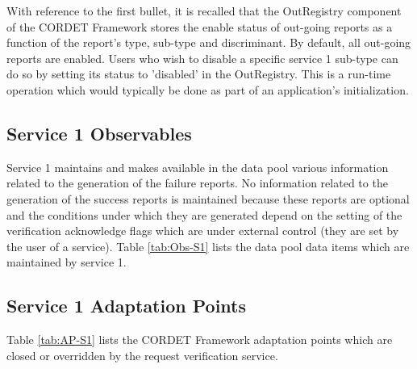 \documentclass{pnp_article}
\begin{document}
With reference to the first bullet, it is recalled that the OutRegistry component of the CORDET Framework stores the enable status of out-going reports as a function of the report's type, sub-type and discriminant. By default, all out-going reports are enabled. Users who wish to disable a specific service 1 sub-type can do so by setting its status to 'disabled' in the OutRegistry. This is a run-time operation which would typically be done as part of an application's initialization.

\newpage
{}

\newpage
{}
\newpage
{}
\newpage
{}


\newpage
\subsection{Service 1 Observables}\label{sec:serv1Obs}
Service 1 maintains and makes available in the data pool various information related to the generation of the failure reports. No information related to the generation of the success reports is maintained because these reports are optional and the conditions under which they are generated depend on the setting of the verification acknowledge flags which are under external control (they are set by the user of a service). Table \ref{tab:Obs-S1} lists the data pool data items which are maintained by service 1.



\newpage
\subsection{Service 1 Adaptation Points}\label{sec:serv1AP}
Table \ref{tab:AP-S1} lists the CORDET Framework adaptation points which are closed or overridden by the request verification service. 
\end{document}
